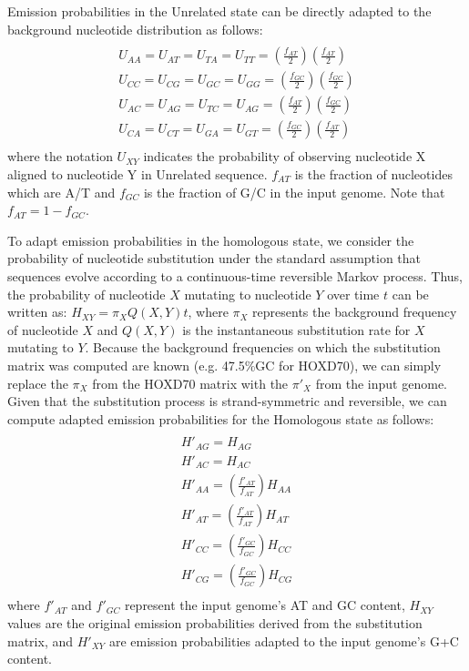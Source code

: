 \documentclass[9.5pt,journal,final,finalsubmission,twocolumn]{IEEEtran}
\begin{document}
Emission
probabilities in the Unrelated state can be directly adapted to the
background nucleotide distribution as follows:
\begin{multline}\\
U_{AA}=U_{AT}=U_{TA}=U_{TT}=(\frac{f_{AT}}{2})(\frac{f_{AT}}{2})\\
U_{CC}=U_{CG}=U_{GC}=U_{GG}=(\frac{f_{GC}}{2})(\frac{f_{GC}}{2})\\
U_{AC}=U_{AG}=U_{TC}=U_{AG}=(\frac{f_{AT}}{2})(\frac{f_{GC}}{2})\\
U_{CA}=U_{CT}=U_{GA}=U_{GT}=(\frac{f_{GC}}{2})(\frac{f_{AT}}{2})\\
\end{multline}
where the notation $U_{XY}$ indicates the probability of observing nucleotide X aligned to
nucleotide Y in Unrelated sequence.  $f_{AT}$ is the fraction of nucleotides which are A/T and
$f_{GC}$ is the fraction of G/C in the input genome.  Note that $f_{AT}=1-f_{GC}$.

To adapt emission probabilities in the homologous state, we consider the
probability of nucleotide substitution under the standard assumption
that sequences evolve according to a continuous-time reversible Markov process.
Thus, the probability of nucleotide $X$ mutating to nucleotide $Y$ over time $t$
can be written as: $H_{XY}=\pi_X Q(X,Y)t$, where $\pi_X$ represents the background
frequency of nucleotide $X$ and $Q(X,Y)$ is the instantaneous substitution rate for $X$
mutating to $Y$. Because the background frequencies on which the substitution matrix was computed are
known (e.g. 47.5\%GC for HOXD70), we can simply replace the $\pi_X$ from the HOXD70 matrix
with the $\pi'_X$ from the input genome. Given that the substitution process is
strand-symmetric and reversible, we can compute adapted
emission probabilities for the Homologous state as follows:
\begin{multline}\\
H'_{AG}=H_{AG}\\
H'_{AC}=H_{AC}\\
H'_{AA}=(\frac{f'_{AT}}{f_{AT}})H_{AA}\\
H'_{AT}=(\frac{f'_{AT}}{f_{AT}})H_{AT}\\
H'_{CC}=(\frac{f'_{GC}}{f_{GC}})H_{CC}\\
H'_{CG}=(\frac{f'_{GC}}{f_{GC}})H_{CG}\\
\end{multline}
where $f'_{AT}$ and $f'_{GC}$ represent the input genome's AT and GC content,
$H_{XY}$ values are the original emission probabilities derived from the
substitution matrix, and $H'_{XY}$ are emission probabilities adapted to
the input genome's G+C content.
\end{document}
